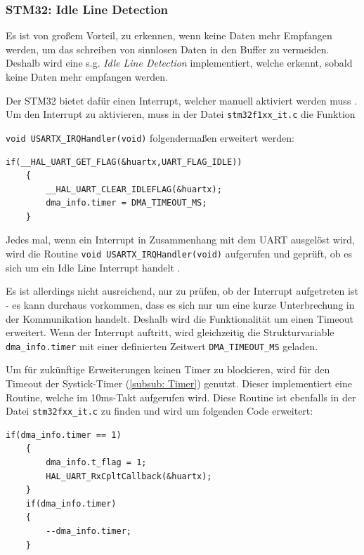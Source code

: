   \subsubsection{STM32: Idle Line Detection}
  \label{subsub: Idle}

  Es ist von großem Vorteil, zu erkennen, wenn keine Daten mehr Empfangen werden, um das schreiben von sinnlosen Daten in den Buffer zu vermeiden.
  Deshalb wird eine s.g. \textit{Idle Line Detection} implementiert, welche erkennt, sobald keine Daten mehr empfangen werden.

  \newpage

  Der STM32 bietet dafür einen Interrupt, welcher manuell aktiviert werden muss \citep{STM32_Ref}. Um den Interrupt zu aktivieren, muss in der Datei
  \lstinline!stm32f1xx_it.c! die Funktion 
  
  \lstinline!void USARTX_IRQHandler(void)! folgendermaßen erweitert werden:

  \begin{lstlisting}[caption={\textit{Idle Line Interrupt}}]
    if(__HAL_UART_GET_FLAG(&huartx,UART_FLAG_IDLE))
    {
        __HAL_UART_CLEAR_IDLEFLAG(&huartx);
        dma_info.timer = DMA_TIMEOUT_MS;
    }
  \end{lstlisting}

  Jedes mal, wenn ein Interrupt in Zusammenhang mit dem \ac{UART} ausgelöst wird, wird die Routine \lstinline!void USARTX_IRQHandler(void)! 
  aufgerufen  und geprüft, ob es sich um ein Idle Line Interrupt handelt \citep{STM32_Ref}. 

  \smallskip

  Es ist allerdings nicht ausreichend, nur zu prüfen, ob der Interrupt aufgetreten ist - es kann durchaus vorkommen, dass es sich nur um eine
  kurze Unterbrechung in der Kommunikation handelt. Deshalb wird die Funktionalität um einen Timeout erweitert. Wenn der Interrupt auftritt, wird
  gleichzeitig die Strukturvariable \lstinline!dma_info.timer! mit einer definierten Zeitwert \lstinline!DMA_TIMEOUT_MS! geladen.

  \smallskip

  Um für zukünftige Erweiterungen keinen Timer zu blockieren, wird für den Timeout der Systick-Timer (\ref{subsub: Timer}) genutzt. Dieser implementiert eine Routine,
  welche im 10ms-Takt aufgerufen wird. Diese Routine ist ebenfalls in der Datei \lstinline!stm32fxx_it.c! zu finden und wird um folgenden Code
  erweitert:

  \begin{lstlisting}[caption={\textit{Systick Timer}}]
    if(dma_info.timer == 1)
    {
        dma_info.t_flag = 1;
        HAL_UART_RxCpltCallback(&huartx);
    }
    if(dma_info.timer) 
    { 
        --dma_info.timer; 
    }



  \end{lstlisting}
  
